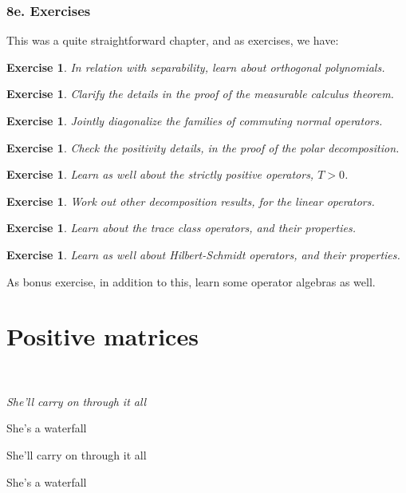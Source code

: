 \documentclass[12pt]{amsbook}
\newtheorem{exercise}[theorem]{Exercise}
\begin{document}
\section*{8e. Exercises}

This was a quite straightforward chapter, and as exercises, we have:

\begin{exercise}
In relation with separability, learn about orthogonal polynomials.
\end{exercise}

\begin{exercise}
Clarify the details in the proof of the measurable calculus theorem.
\end{exercise}

\begin{exercise}
Jointly diagonalize the families of commuting normal operators.
\end{exercise}

\begin{exercise}
Check the positivity details, in the proof of the polar decomposition.
\end{exercise}

\begin{exercise}
Learn as well about the strictly positive operators, $T>0$.
\end{exercise}

\begin{exercise}
Work out other decomposition results, for the linear operators.
\end{exercise}

\begin{exercise}
Learn about the trace class operators, and their properties.
\end{exercise}

\begin{exercise}
Learn as well about Hilbert-Schmidt operators, and their properties.
\end{exercise}

As bonus exercise, in addition to this, learn some operator algebras as well.

\part{Positive matrices}

\ \vskip50mm

\begin{center}
{\em She'll carry on through it all

She's a waterfall

She'll carry on through it all

She's a waterfall}
\end{center}
\end{document}
